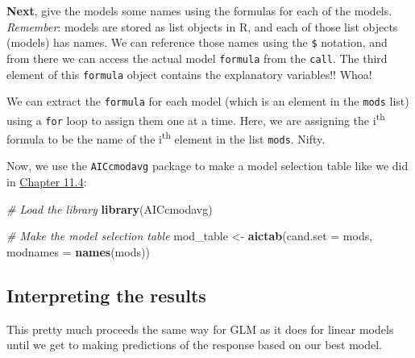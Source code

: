 \documentclass[
]{book}
\newenvironment{Shaded}{\begin{snugshade}}{\end{snugshade}}
\newcommand{\CommentTok}[1]{\textcolor[rgb]{0.56,0.35,0.01}{\textit{#1}}}
\newcommand{\ControlFlowTok}[1]{\textcolor[rgb]{0.13,0.29,0.53}{\textbf{#1}}}
\newcommand{\DataTypeTok}[1]{\textcolor[rgb]{0.13,0.29,0.53}{#1}}
\newcommand{\DecValTok}[1]{\textcolor[rgb]{0.00,0.00,0.81}{#1}}
\newcommand{\KeywordTok}[1]{\textcolor[rgb]{0.13,0.29,0.53}{\textbf{#1}}}
\newcommand{\NormalTok}[1]{#1}
\newcommand{\OperatorTok}[1]{\textcolor[rgb]{0.81,0.36,0.00}{\textbf{#1}}}
\newcommand{\StringTok}[1]{\textcolor[rgb]{0.31,0.60,0.02}{#1}}
\begin{document}
\textbf{Next}, give the models some names using the formulas for each of the models. \emph{Remember}: models are stored as list objects in R, and each of those list objects (models) has names. We can reference those names using the \texttt{\$} notation, and from there we can access the actual model \texttt{formula} from the \texttt{call}. The third element of this \texttt{formula} object contains the explanatory variables!! Whoa!

We can extract the \texttt{formula} for each model (which is an element in the \texttt{mods} list) using a \texttt{for} loop to assign them one at a time. Here, we are assigning the i\textsuperscript{th} formula to be the name of the i\textsuperscript{th} element in the list \texttt{mods}. Nifty.

\begin{Shaded}
\end{Shaded}

Now, we use the \texttt{AICcmodavg} package to make a model selection table like we did in \protect\hyperlink{a-prior}{Chapter 11.4}:

\begin{Shaded}
\begin{Highlighting}[]
\CommentTok{# Load the library}
\KeywordTok{library}\NormalTok{(AICcmodavg)}

\CommentTok{# Make the model selection table}
\NormalTok{mod_table <-}\StringTok{ }\KeywordTok{aictab}\NormalTok{(}\DataTypeTok{cand.set =}\NormalTok{ mods, }\DataTypeTok{modnames =} \KeywordTok{names}\NormalTok{(mods))}
\end{Highlighting}
\end{Shaded}

\hypertarget{interpreting-the-results}{%
\subsection{Interpreting the results}\label{interpreting-the-results}}

This pretty much proceeds the same way for GLM as it does for linear models until we get to making predictions of the response based on our best model.
\end{document}
